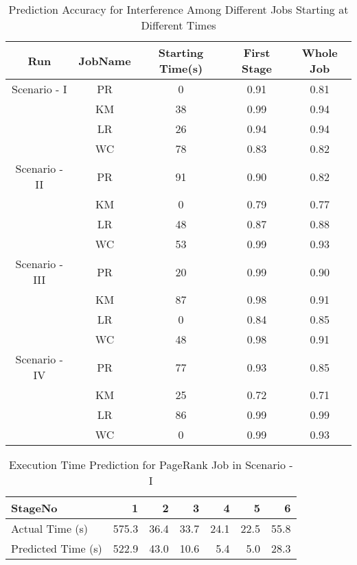 
\begin{table*}[!t]
\renewcommand{\arraystretch}{1.3}
\caption {Prediction Accuracy for Interference Among Different Jobs Starting at Different Times}
\label{table_differentjob_differentstarttime}
\centering
\begin{tabular}{c|c|c|c|c}
\hline

\bfseries Run & \bfseries JobName & \bfseries Starting Time(s) & \bfseries First Stage & \bfseries Whole Job\\
\hline\hline
Scenario - I & PR & 0 & 0.91 & 0.81\\
& KM & 38 & 0.99 & 0.94\\
& LR & 26 & 0.94 & 0.94 \\
& WC & 78 & 0.83 & 0.82\\
\hline
Scenario - II & PR & 91 & 0.90 & 0.82\\
& KM & 0 & 0.79 & 0.77\\
& LR & 48 & 0.87 & 0.88\\
& WC & 53 & 0.99 & 0.93\\
\hline
Scenario - III & PR & 20 & 0.99 & 0.90\\
& KM & 87 & 0.98 & 0.91\\
& LR & 0 & 0.84 & 0.85\\
& WC & 48 & 0.98 & 0.91\\
\hline
Scenario - IV & PR & 77 & 0.93 & 0.85\\
& KM & 25 & 0.72 & 0.71\\
& LR & 86 & 0.99 & 0.99 \\
& WC & 0 & 0.99 & 0.93\\
\hline
\end{tabular}
\end{table*} 




\begin{table*}[!htb]
\renewcommand{\arraystretch}{1.3}
\caption{Execution Time Prediction for PageRank Job in Scenario - I}
\label{bpr}
\centering
\begin{tabular}{l|r|r|r|r|r|r}
\hline
\bfseries StageNo & \bfseries 1 & \bfseries 2 & \bfseries 3 & \bfseries 4 & \bfseries 5 & \bfseries 6 \\
\hline \hline
Actual Time (s)
&575.3
&36.4
&33.7
&24.1
&22.5
&55.8 \\
\hline
Predicted Time (s) 
&522.9
&43.0
&10.6
&5.4
&5.0
&28.3 \\
\hline
\end{tabular}
\end{table*}

